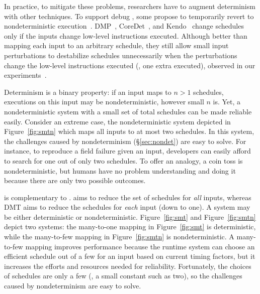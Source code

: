 In practice, to mitigate these problems, researchers have to augment
determinism with other techniques.  To support debug , some
propose to temporarily revert to nondeterministic
execution~\cite{dmp:asplos09}.  DMP~\cite{dmp:asplos09},
CoreDet~\cite{coredet:asplos10}, and Kendo~\cite{kendo:asplos09} change
schedules only if the inputs change low-level instructions executed.
Although better than mapping each input to an arbitrary schedule, they
still allow small input perturbations to destabilize schedules
unnecessarily when the perturbations change the low-level instructions
executed (\eg, one extra  executed), observed in our
experiments~\cite{cui:tern:osdi10}.

 Determinism
is a binary property: if an input maps to $n > 1$ schedules, executions on this
input may be nondeterministic, however small $n$ is.  Yet, a nondeterministic
system with a small set of total schedules can be made reliable easily. 
Consider an extreme case, the nondeterministic system depicted in
Figure~\ref{fig:smtn} which maps all inputs to at most two schedules.  In this
system, the challenges caused by nondeterminism (\S\ref{sec:nondet}) are
easy to solve.  For instance, to reproduce a field failure given an input,
developers can easily afford to search for one out of only two schedules.
To offer an analogy, a coin toss is nondeterministic, but humans have
no problem understanding and doing it because there are only two possible
outcomes.

\dmt is complementary to \smt. \smt aims to reduce the set of schedules for
\emph{all} inputs, whereas DMT aims to reduce the schedules for \emph{each}
input (down to one).  A \smt system may be either deterministic or
nondeterministic. Figure~\ref{fig:smt} and Figure~\ref{fig:smtn} depict two \smt
systems: the many-to-one mapping in Figure~\ref{fig:smt} is deterministic, while
the many-to-few mapping in Figure~\ref{fig:smtn} is nondeterministic.  A
many-to-few mapping improves performance because the runtime system can choose
an efficient schedule out of a few for an input based on current timing factors,
but it increases the efforts and resources needed for reliability.  Fortunately,
the choices of schedules are only a few (\eg, a small constant such as two), so
the challenges caused by nondeterminism are easy to solve.
